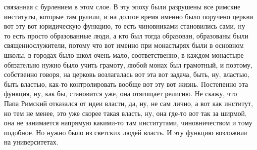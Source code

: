 связанная с бурлением в этом слое. В эту эпоху были разрушены все римские
институты, которые там рулили, и на долгое время именно было поручено церкви вот
эту вот юридическую функцию, то есть чиновниками становились сами, ну то есть
просто образованные люди, а кто был тогда образован, образованы были
священнослужители, потому что вот именно при монастырях были в основном школы, в
городах было школ очень мало, соответственно, в каждом монастыре обязательно
нужно было учить грамоту, любой монах был грамотный, и поэтому, собственно
говоря, на церковь возлагалась вот эта вот задача, быть, ну, властью, быть
властью, как-то контролировать вообще вот эту вот жизнь. Постепенно эта функция,
ну, как бы, становится уже, она отягощает религию. Не скажу, что Папа Римский
отказался от идеи власти, да, ну, не сам лично, а вот как институт, но тем не
менее, это уже скорее такая власть, ну, она где-то вот так за ширмой, она не
занимается напрямую какими-то там институтами, чиновничеством и тому подобное.
Но нужно было из светских людей власть. И эту функцию возложили на
университетах. 

